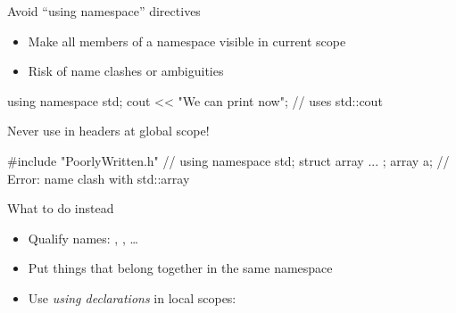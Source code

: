 \begin{advanced}
\begin{frame}[fragile]
  \begin{alertblock}{Avoid ``using namespace'' directives}
    \begin{itemize}
      \item Make all members of a namespace visible in current scope
      \item Risk of name clashes or ambiguities
    \end{itemize}
    \begin{cppcode*}{}
      using namespace std;
      cout << "We can print now\n"; // uses std::cout
    \end{cppcode*}
  \end{alertblock}
  \begin{alertblock}{Never use in headers at global scope!}
    \begin{cppcode*}{}
      #include "PoorlyWritten.h" // using namespace std;
      struct array { ... };
      array a;  // Error: name clash with std::array
    \end{cppcode*}
  \end{alertblock}
  \begin{block}{What to do instead}
    \begin{itemize}
      \item Qualify names: , , \ldots
      \item Put things that belong together in the same namespace
      \item Use \textit{using declarations} in local scopes: 
    \end{itemize}
  \end{block}
\end{frame}

\end{advanced}
